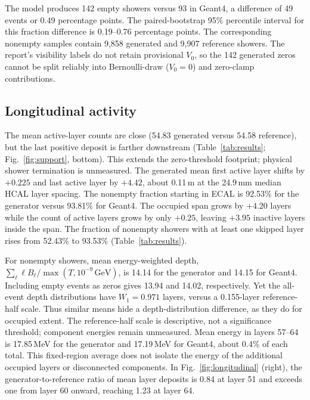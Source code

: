 \documentclass[10pt]{article}
\newcommand{\GeV}{\,\mathrm{GeV}}
\begin{document}
The model produces 142 empty showers versus 93 in Geant4, a difference of 49 events or 0.49 percentage points. The paired-bootstrap 95\% percentile interval for this fraction difference is 0.19--0.76 percentage points. The corresponding nonempty samples contain 9,858 generated and 9,907 reference showers. The report's visibility labels do not retain provisional $V_0$, so the 142 generated zeros cannot be split reliably into Bernoulli-draw ($V_0=0$) and zero-clamp contributions.

\subsection{Longitudinal activity}

The mean active-layer counts are close (54.83 generated versus 54.58 reference), but the last positive deposit is farther downstream (Table~\ref{tab:results}; Fig.~\ref{fig:support}, bottom). This extends the zero-threshold footprint; physical shower termination is unmeasured. The generated mean first active layer shifts by $+0.225$ and last active layer by $+4.42$, about 0.11\,m at the 24.9\,mm median HCAL layer spacing. The nonempty fraction starting in ECAL is 92.53\% for the generator versus 93.81\% for Geant4. The occupied span grows by $+4.20$ layers while the count of active layers grows by only $+0.25$, leaving $+3.95$ inactive layers inside the span. The fraction of nonempty showers with at least one skipped layer rises from 52.43\% to 93.53\% (Table~\ref{tab:results}).

For nonempty showers, mean energy-weighted depth, $\sum_\ell\ell B_\ell/\max(T,10^{-9}\GeV)$, is 14.14 for the generator and 14.15 for Geant4. Including empty events as zeros gives 13.94 and 14.02, respectively. Yet the all-event depth distributions have $W_1=0.971$ layers, versus a 0.155-layer reference-half scale. Thus similar means hide a depth-distribution difference, as they do for occupied extent. The reference-half scale is descriptive, not a significance threshold; component energies remain unmeasured. Mean energy in layers 57--64 is 17.85\,MeV for the generator and 17.19\,MeV for Geant4, about 0.4\% of each total. This fixed-region average does not isolate the energy of the additional occupied layers or disconnected components. In Fig.~\ref{fig:longitudinal} (right), the generator-to-reference ratio of mean layer deposits is 0.84 at layer 51 and exceeds one from layer 60 onward, reaching 1.23 at layer 64.
\end{document}
